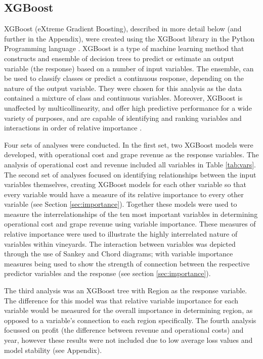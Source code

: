 \documentclass[review,12pt,authoryear]{elsarticle}
\begin{document}
\begin{linenumbers}
\subsection{XGBoost}
XGBoost (eXtreme Gradient Boosting), described in more detail below (and further in the Appendix), were created using the XGBoost library \citep{chenXGBoostScalableTree2016} in the Python Programming language \citep{g.vanrossumPythonTutorialTechnical1995}. XGBoost is a type of machine learning method that constructs and ensemble of decision trees to predict or estimate an output variable (the response) based on a number of input variables. The ensemble, can be used to classify classes or predict a continuous response, depending on the nature of the output variable. They were chosen for this analysis as the data contained a mixture of class and continuous variables. Moreover, XGBoost is unaffected by multicollinearity, and offer high predictive performance for a wide variety of purposes, and are capable of identifying and ranking variables and interactions in order of relative importance \citep{chenXGBoostScalableTree2016}.
\par
Four sets of analyses were conducted. In the first set, two XGBoost models were developed, with operational cost and grape revenue as the response variables. The analysis of operational cost and revenue included all variables in Table \ref{tab:vars}. The second set of analyses focused on identifying relationships between the input variables themselves, creating XGBoost models for each other variable so that every variable would have a measure of its relative importance to every other variable (see Section \ref{sec:importance}). Together these models were used to measure the interrelationships of the ten most important variables in determining operational cost and grape revenue using variable importance. These measures of relative importance were used to illustrate the highly interrelated nature of variables within vineyards. The interaction between variables was depicted through the use of Sankey and Chord diagrams; with variable importance measures being used to show the strength of connection between the respective predictor variables and the response (see section \ref{sec:importance}).
\par
The third analysis was an XGBoost tree with Region as the response variable. The difference for this model was that relative variable importance for each variable would be measured for the overall importance in determining region, as opposed to a variable's connection to each region specifically. The fourth analysis focussed on profit (the difference between revenue and operational costs) and year, however these results were not included due to low average loss values and model stability (see Appendix).

\end{linenumbers}
\end{document}

